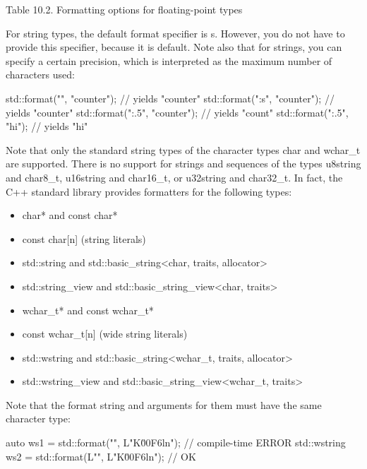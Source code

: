 \begin{center}
Table 10.2. Formatting options for floating-point types
\end{center}


For string types, the default format specifier is s. However, you do not have to provide this specifier, because it is default. Note also that for strings, you can specify a certain precision, which is interpreted as the maximum number of characters used:

\begin{cpp}
std::format("{}", "counter"); // yields "counter"
std::format("{:s}", "counter"); // yields "counter"
std::format("{:.5}", "counter"); // yields "count"
std::format("{:.5}", "hi"); // yields "hi"
\end{cpp}

Note that only the standard string types of the character types char and wchar\_t are supported. There is no support for strings and sequences of the types u8string and char8\_t, u16string and char16\_t, or u32string and char32\_t. In fact, the C++ standard library provides formatters for the following types:

\begin{itemize}
\item 
char* and const char*

\item 
const char[n] (string literals)

\item 
std::string and std::basic\_string<char, traits, allocator>

\item 
std::string\_view and std::basic\_string\_view<char, traits>

\item 
wchar\_t* and const wchar\_t*

\item 
const wchar\_t[n] (wide string literals)

\item 
std::wstring and std::basic\_string<wchar\_t, traits, allocator>

\item 
std::wstring\_view and std::basic\_string\_view<wchar\_t, traits>
\end{itemize}

Note that the format string and arguments for them must have the same character type:

\begin{cpp}
auto ws1 = std::format("{}", L"K\u00F6ln"); // compile-time ERROR
std::wstring ws2 = std::format(L"{}", L"K\u00F6ln"); // OK
\end{cpp}


